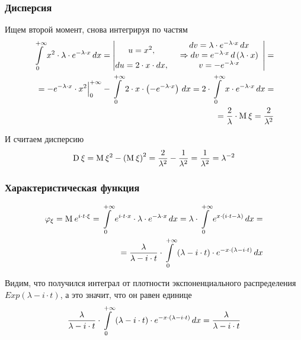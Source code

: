 \subsubsection{Дисперсия}
Ищем второй момент, снова интегрируя по частям
\begin{align*}
    \integral{0}{+\infty}{x}{x^2 \cdot \lambda \cdot e^{-\lambda \cdot x}}
    = \begin{vmatrix}
        u = x^2, & \begin{array}{c}
            dv = \lambda \cdot e^{-\lambda \cdot x} \, dx\\
            \Rightarrow
                dv = e^{-\lambda \cdot x} \, d\left( \lambda \cdot x \right)
           \end{array}\\
        du = 2 \cdot x \cdot dx, & v = - e^{-\lambda \cdot x}
    \end{vmatrix} = \\
    = \Bigl. - e^{-\lambda \cdot x} \cdot x^2 \Bigr|_0^{+\infty}
        - \integral{0}{+\infty}{x}{
            2 \cdot x \cdot \left( - e^{-\lambda \cdot x} \right)}
    = 2 \cdot \integral{0}{+\infty}{x}{x \cdot e^{-\lambda \cdot x}} = \\
    = \frac{2}{\lambda} \cdot \mean{\xi} = \frac{2}{\lambda^2}
\end{align*}

И считаем дисперсию
$$\dispersion{\xi}
    = \mean{\xi^2} - \left( \mean{\xi} \right)^2
    = \frac{2}{\lambda^2} - \frac{1}{\lambda^2}
    = \frac{1}{\lambda^2} = \lambda^{-2}$$
\subsubsection{Характеристическая функция}
\begin{align*}
    \varphi_{\xi}
        = \mean{e^{i \cdot t \cdot \xi}}
        = \integral{0}{+\infty}{x}{
            e^{i \cdot t \cdot x} \cdot \lambda \cdot e^{-\lambda \cdot x}}
        = \lambda \cdot \integral{0}{+\infty}{x}{
            e^{x \cdot \left( i \cdot t - \lambda \right)}} = \\
        = \frac{\lambda}{\lambda - i \cdot t} \cdot \integral{0}{+\infty}{x}{
            \left( \lambda - i \cdot t \right)
                \cdot e^{- x \cdot \left( \lambda - i \cdot t \right)}}
\end{align*}

Видим, что получился интеграл от плотности
экспоненциального распределения $Exp\left( \lambda - i \cdot t \right)$,
а это значит, что он равен единице
\begin{align*}
    \frac{\lambda}{\lambda - i \cdot t} \cdot \integral{0}{+\infty}{x}{
        \left( \lambda - i \cdot t \right)
            \cdot e^{- x \cdot \left( \lambda - i \cdot t \right)}}
        = \frac{\lambda}{\lambda - i \cdot t}%
\end{align*}
